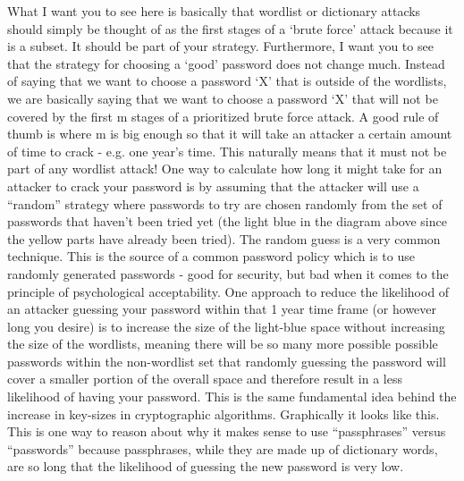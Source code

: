 What I want you to see here is basically that wordlist or dictionary attacks should simply be thought of as the first stages of a ‘brute force’ attack because it is a subset. It should be part of your strategy. Furthermore, I want you to see that the strategy for choosing a ‘good’ password does not change much. Instead of saying that we want to choose a password ‘X’ that is outside of the wordlists, we are basically saying that we want to choose a password ‘X’ that will not be covered by the first m stages of a prioritized brute force attack. A good rule of thumb is where m is big enough so that it will take an attacker a certain amount of time to crack - e.g. one year’s time. This naturally means that it must not be part of any wordlist attack!
One way to calculate how long it might take for an attacker to crack your password is by assuming that the attacker will use a “random” strategy where passwords to try are chosen randomly from the set of passwords that haven’t been tried yet (the light blue in the diagram above since the yellow parts have already been tried). The random guess is a very common technique. This is the source of a common password policy which is to use randomly generated passwords - good for security, but bad when it comes to the principle of psychological acceptability.
One approach to reduce the likelihood of an attacker guessing your password within that 1 year time frame (or however long you desire) is to increase the size of the light-blue space without increasing the size of the wordlists, meaning there will be so many more possible possible passwords within the non-wordlist set that randomly guessing the password will cover a smaller portion of the overall space and therefore result in a less likelihood of having your password. This is the same fundamental idea behind the increase in key-sizes in cryptographic algorithms. Graphically it looks like this. This is one way to reason about why it makes sense to use “passphrases” versus “passwords” because passphrases, while they are made up of dictionary words, are so long that the likelihood of guessing the new password is very low.

